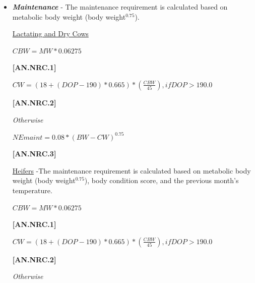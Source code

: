 \documentclass{article}
\begin{document}
\begin{refsection}
    \begin{itemize}
        \item \textbf{\textit{Maintenance}} - The maintenance requirement is calculated based on metabolic body weight (body weight\(^ {0.75}\)).
        
        \vspace{0.2cm}
        \underline {Lactating and Dry Cows}
        
        \vspace{0.25cm}
\begin{center}
    \(CBW = MW * 0.06275\)
\end{center}
\vspace{0.5cm}
            {\raggedleft \textbf{[AN.NRC.1]}\par}

\vspace{0.25cm}
\begin{center}
    \(CW = {(18 + (DOP - 190) * 0.665) * ( \frac{CBW}{45}), if DOP > 190.0}\)
\end{center}
\vspace{0.5cm}
            {\raggedleft \textbf{[AN.NRC.2]}\par}
\textit{\small Otherwise}
\vspace{0.25cm}

\begin{center}
    \(NEmaint = 0.08 * (BW - CW)^{0.75}\)
\end{center}
\vspace{0.5cm}
            {\raggedleft \textbf{[AN.NRC.3]}\par}

        \vspace{0.2cm}
        \underline {Heifers} -The maintenance requirement is calculated based on metabolic body weight (body weight\(^{0.75}\)), body condition score, and the previous month's temperature.
        \vspace{0.25cm}

    
\begin{center}
    \(CBW = MW * 0.06275\)
\end{center}
\vspace{0.5cm}
            {\raggedleft \textbf{[AN.NRC.1]}\par}

\vspace{0.25cm}
\begin{center}
    \(CW = {(18 + (DOP - 190) * 0.665) * ( \frac{CBW}{45}), if DOP > 190.0}\)
\end{center}
\vspace{0.5cm}
            {\raggedleft \textbf{[AN.NRC.2]}\par}
\textit{\small Otherwise}
\vspace{0.25cm}



\end{itemize}
\end{refsection}
\end{document}
